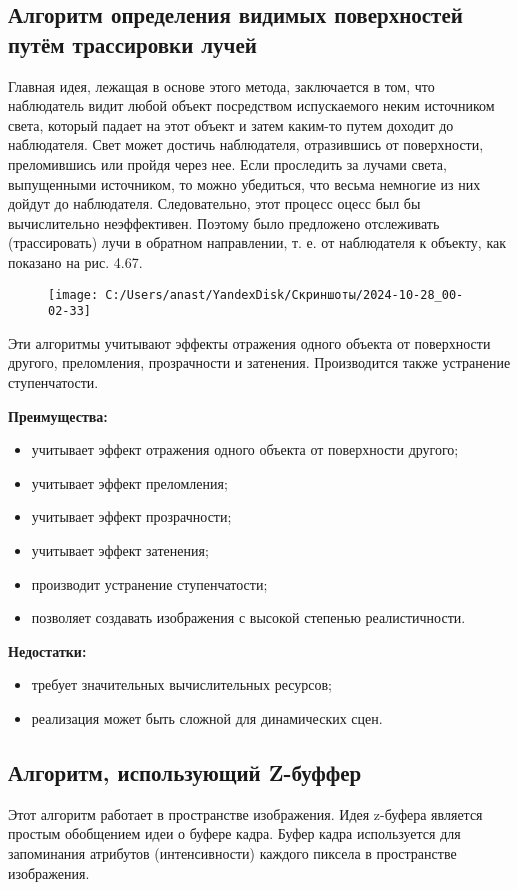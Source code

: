 \subsection{Алгоритм определения видимых поверхностей путём трассировки лучей}
Главная идея, лежащая в основе этого метода, заключается в том, что наблюдатель видит любой объект посредством испускаемого неким источником света, который падает на этот объект и затем каким-то путем доходит до наблюдателя. Свет может достичь наблюдателя, отразившись от поверхности, преломившись или пройдя через нее. Если проследить за лучами света, выпущенными источником, то можно убедиться, что весьма немногие из них дойдут до наблюдателя. Следовательно, этот процесс оцесс был бы вычислительно неэффективен. Поэтому было предложено отслеживать (трассировать) лучи в обратном направлении, т. е. от наблюдателя к объекту, как показано на рис. 4.67.
\begin{figure}[h]
	\centering
	\texttt{[image: C:/Users/anast/YandexDisk/Скриншоты/2024-10-28\_00-02-33]}
	\caption{}
	\label{fig:2024-10-2800-02-33}
\end{figure}

Эти алгоритмы учитывают эффекты отражения одного объекта от поверхности другого, преломления, прозрачности и затенения. Производится также устранение ступенчатости.

\textbf{Преимущества:}
\begin{itemize}
	\item учитывает эффект отражения одного объекта от поверхности другого;
	\item учитывает эффект преломления;
	\item учитывает эффект прозрачности;
	\item учитывает эффект затенения;
	\item производит устранение ступенчатости;
	\item позволяет создавать изображения с высокой степенью реалистичности.
\end{itemize}

\textbf{Недостатки:}
\begin{itemize}
	\item требует значительных вычислительных ресурсов;
	\item реализация может быть сложной для динамических сцен.
\end{itemize} 
\subsection{Алгоритм, использующий Z-буффер}
Этот алгоритм работает в пространстве изображения. Идея z-буфера является простым обобщением идеи о буфере кадра. Буфер кадра используется для запоминания атрибутов (интенсивности) каждого пиксела в пространстве изображения. 

